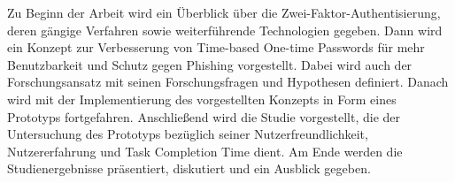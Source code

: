 Zu Beginn der Arbeit wird ein Überblick über die 
Zwei-Faktor-Authentisierung, deren gängige Verfahren sowie 
weiterführende Technologien gegeben. Dann wird ein Konzept zur 
Verbesserung von Time-based One-time Passwords für mehr 
Benutzbarkeit und Schutz gegen Phishing vorgestellt. Dabei wird 
auch der Forschungsansatz mit seinen Forschungsfragen und 
Hypothesen definiert. Danach wird mit der Implementierung des 
vorgestellten Konzepts in Form eines Prototyps fortgefahren. 
Anschließend wird die Studie vorgestellt, die der Untersuchung 
des Prototyps bezüglich seiner Nutzerfreundlichkeit, 
Nutzererfahrung und Task Completion Time dient. Am Ende werden 
die Studienergebnisse präsentiert, diskutiert und ein Ausblick 
gegeben.